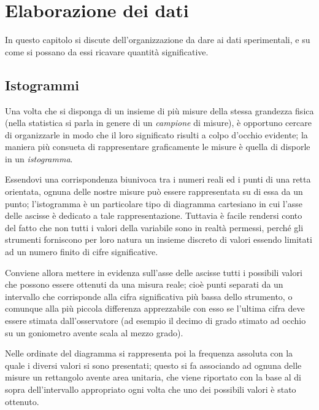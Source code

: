 
\chapter{Elaborazione dei dati}
In questo capitolo si discute dell'organizzazione da dare ai
dati sperimentali, e su come si possano da essi ricavare
quantit\`a significative.

\section{Istogrammi}%
Una volta che si disponga di un insieme di pi\`u misure
della stessa grandezza fisica (nella statistica si parla in
genere di un \emph{campione} di misure), \`e opportuno
cercare di organizzarle in modo che il loro significato
risulti a colpo d'occhio evidente; la maniera pi\`u consueta
di rappresentare graficamente le misure \`e quella di
disporle in un \emph{istogramma}.

Essendovi una corrispondenza biunivoca tra i numeri reali ed
i punti di una retta orientata, ognuna delle nostre misure
pu\`o essere rappresentata su di essa da un punto;
l'istogramma \`e un particolare tipo di diagramma cartesiano
in cui l'asse delle ascisse \`e dedicato a tale
rappresentazione.  Tuttavia \`e facile rendersi conto del
fatto che non tutti i valori della variabile sono in
realt\`a permessi, perch\'e gli strumenti forniscono per
loro natura un insieme discreto di valori essendo limitati
ad un numero finito di cifre significative.

Conviene allora mettere in evidenza sull'asse delle ascisse
tutti i possibili valori che possono essere ottenuti da una
misura reale; cio\`e punti separati da un intervallo che
corrisponde alla cifra significativa pi\`u bassa dello
strumento, o comunque alla pi\`u piccola differenza
apprezzabile con esso se l'ultima cifra deve essere stimata
dall'osservatore (ad esempio il decimo di grado stimato ad
occhio su un goniometro avente scala al mezzo grado).

Nelle ordinate del diagramma si rappresenta poi la frequenza
assoluta con la quale i diversi valori si sono presentati;
questo si fa associando ad ognuna delle misure un rettangolo
avente area unitaria, che viene riportato con la base al di
sopra dell'intervallo appropriato ogni volta che uno dei
possibili valori \`e stato ottenuto.

